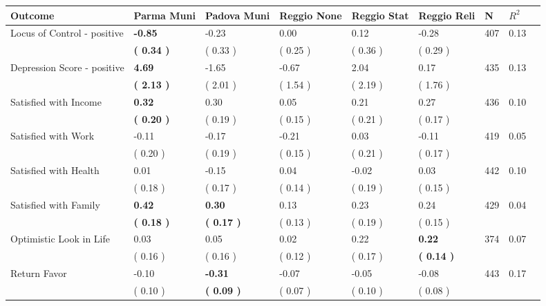 \begin{tabular}{L{6.2cm} C{1.8cm} C{1.8cm} C{1.8cm} C{1.8cm} C{1.8cm} C{1.8cm} C{0.3cm} C{0.3cm}}
\toprule
 \textbf{Outcome} & \textbf{Parma Muni} & \textbf{Padova Muni} & \textbf{Reggio None} & \textbf{Reggio Stat} & \textbf{Reggio Reli} & \textbf{N} & \textbf{$ R^2$} \\
\midrule
Locus of Control - positive & \textbf{    -0.85} &     -0.23 &      0.00 &      0.12 &     -0.28  & 407 &       0.13 \\ 
 & \textbf{(     0.34 )} & (     0.33 ) & (     0.25 ) & (     0.36 ) & (     0.29 )  & \\
Depression Score - positive & \textbf{     4.69} &     -1.65 &     -0.67 &      2.04 &      0.17  & 435 &       0.13 \\ 
 & \textbf{(     2.13 )} & (     2.01 ) & (     1.54 ) & (     2.19 ) & (     1.76 )  & \\
Satisfied with Income & \textbf{     0.32} &      0.30 &      0.05 &      0.21 &      0.27  & 436 &       0.10 \\ 
 & \textbf{(     0.20 )} & (     0.19 ) & (     0.15 ) & (     0.21 ) & (     0.17 )  & \\
Satisfied with Work &     -0.11 &     -0.17 &     -0.21 &      0.03 &     -0.11  & 419 &       0.05 \\ 
 & (     0.20 ) & (     0.19 ) & (     0.15 ) & (     0.21 ) & (     0.17 )  & \\
Satisfied with Health &      0.01 &     -0.15 &      0.04 &     -0.02 &      0.03  & 442 &       0.10 \\ 
 & (     0.18 ) & (     0.17 ) & (     0.14 ) & (     0.19 ) & (     0.15 )  & \\
Satisfied with Family & \textbf{     0.42} & \textbf{     0.30} &      0.13 &      0.23 &      0.24  & 429 &       0.04 \\ 
 & \textbf{(     0.18 )} & \textbf{(     0.17 )} & (     0.13 ) & (     0.19 ) & (     0.15 )  & \\
Optimistic Look in Life &      0.03 &      0.05 &      0.02 &      0.22 & \textbf{     0.22}  & 374 &       0.07 \\ 
 & (     0.16 ) & (     0.16 ) & (     0.12 ) & (     0.17 ) & \textbf{(     0.14 )}  & \\
Return Favor &     -0.10 & \textbf{    -0.31} &     -0.07 &     -0.05 &     -0.08  & 443 &       0.17 \\ 
 & (     0.10 ) & \textbf{(     0.09 )} & (     0.07 ) & (     0.10 ) & (     0.08 )  & \\

\end{tabular}
